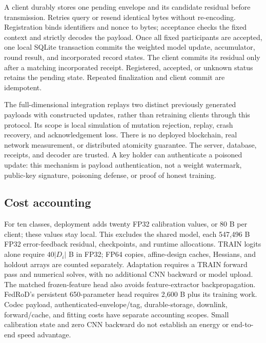 A client durably stores one pending envelope and its candidate residual before transmission. Retries query or resend identical bytes without re-encoding. Registration binds identifiers and nonce to bytes; acceptance checks the fixed context and strictly decodes the payload. Once all fixed participants are accepted, one local SQLite transaction commits the weighted model update, accumulator, round result, and incorporated record states. The client commits its residual only after a matching incorporated receipt. Registered, accepted, or unknown status retains the pending state. Repeated finalization and client commit are idempotent.

The full-dimensional integration replays two distinct previously generated payloads with constructed updates, rather than retraining clients through this protocol. Its scope is local simulation of mutation rejection, replay, crash recovery, and acknowledgement loss. There is no deployed blockchain, real network measurement, or distributed atomicity guarantee. The server, database, receipts, and decoder are trusted. A key holder can authenticate a poisoned update: this mechanism is payload authentication, not a weight watermark, public-key signature, poisoning defense, or proof of honest training.

\subsection{Cost accounting}

For ten classes, deployment adds twenty FP32 calibration values, or 80 B per client; these values stay local. This excludes the shared model, each 547,496 B FP32 error-feedback residual, checkpoints, and runtime allocations. TRAIN logits alone require $40|D_i|$ B in FP32; FP64 copies, affine-design caches, Hessians, and holdout arrays are counted separately. Adaptation requires a TRAIN forward pass and numerical solves, with no additional CNN backward or model upload. The matched frozen-feature head also avoids feature-extractor backpropagation. FedRoD's persistent 650-parameter head requires 2,600 B plus its training work. Codec payload, authenticated-envelope/tag, durable-storage, downlink, forward/cache, and fitting costs have separate accounting scopes. Small calibration state and zero CNN backward do not establish an energy or end-to-end speed advantage.
